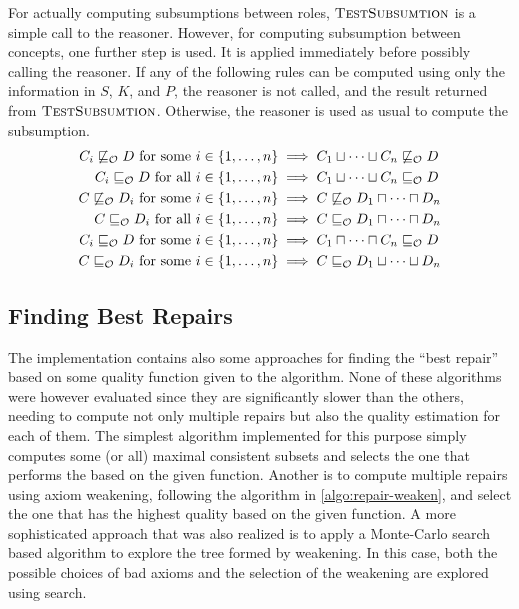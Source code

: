 For actually computing subsumptions between roles, $\textsc{TestSubsumtion}$ is a simple call to the reasoner. However, for computing subsumption between concepts, one further step is used. It is applied immediately before possibly calling the reasoner. If any of the following rules can be computed using only the information in $S$, $K$, and $P$, the reasoner is not called, and the result returned from $\textsc{TestSubsumtion}$. Otherwise, the reasoner is used as usual to compute the subsumption.
\begin{align*}
  C_i \not\sqsubseteq_\mathcal{O} D \text{ for some } i \in \{ 1, \dots, n \} &\implies C_1 \sqcup \cdots \sqcup C_n \not\sqsubseteq_\mathcal{O} D \\
  C_i \sqsubseteq_\mathcal{O} D \text{ for all } i \in \{ 1, \dots, n \} &\implies C_1 \sqcup \cdots \sqcup C_n \sqsubseteq_\mathcal{O} D \\
  C \not\sqsubseteq_\mathcal{O} D_i \text{ for some } i \in \{ 1, \dots, n \} &\implies C \not\sqsubseteq_\mathcal{O} D_1 \sqcap \cdots \sqcap D_n \\
  C \sqsubseteq_\mathcal{O} D_i \text{ for all } i \in \{ 1, \dots, n \} &\implies C \sqsubseteq_\mathcal{O} D_1 \sqcap \cdots \sqcap D_n \\
  C_i \sqsubseteq_\mathcal{O} D \text{ for some } i \in \{ 1, \dots, n \} &\implies C_1 \sqcap \dots \sqcap C_n \sqsubseteq_\mathcal{O} D \\
  C \sqsubseteq_\mathcal{O} D_i \text{ for some } i \in \{ 1, \dots, n \} &\implies C \sqsubseteq_\mathcal{O} D_1 \sqcup \cdots \sqcup D_n \\
\end{align*}

\subsection{Finding Best Repairs}\label{best-repair-impl}

The implementation contains also some approaches for finding the ``best repair'' based on some quality function given to the algorithm. None of these algorithms were however evaluated since they are significantly slower than the others, needing to compute not only multiple repairs but also the quality estimation for each of them. The simplest algorithm implemented for this purpose simply computes some (or all) maximal consistent subsets and selects the one that performs the based on the given function. Another is to compute multiple repairs using axiom weakening, following the algorithm in \cref{algo:repair-weaken}, and select the one that has the highest quality based on the given function. A more sophisticated approach that was also realized is to apply a Monte-Carlo search \cite{coulom2006efficient} based algorithm to explore the tree formed by weakening. In this case, both the possible choices of bad axioms and the selection of the weakening are explored using search.

